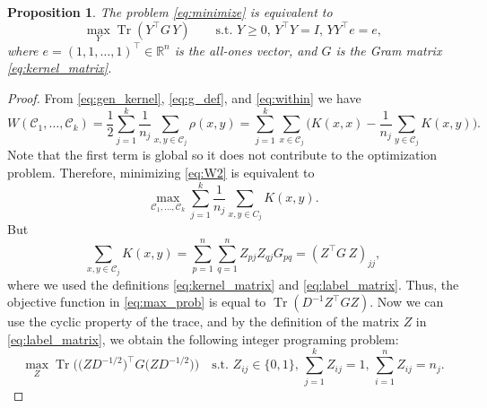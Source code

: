 \documentclass[aps,preprint,nofootinbib,floatfix]{revtex4-1}
\newtheorem{proposition}[theorem]{Proposition}
\DeclareMathOperator{\Tr}{Tr}
\newcommand\kk{K}
\newcommand\C{{\mathcal{C}}}
\newcommand\Zt{Y}
\newcommand\e{e}
\begin{document}
\begin{proposition} 
\label{th:qcqp2}
The problem \eqref{eq:minimize} is equivalent to
\begin{equation}
\label{eq:qcqp2}
\max_{\Zt} \Tr \left( \Zt^\top G \, \Zt \right)  \qquad
\mbox{s.t. $\Zt \ge 0$, $\Zt^\top \Zt = I$, 
$\Zt \Zt^\top \e = \e$},
\end{equation}
where $\e = (1,1,\dots,1)^\top \in \mathbb{R}^n$ is the all-ones vector,
and $G$ is the Gram matrix \eqref{eq:kernel_matrix}.
\end{proposition}
\begin{proof}
From 
\eqref{eq:gen_kernel},
\eqref{eq:g_def}, and
\eqref{eq:within}
we have
\begin{equation}
\label{eq:W2}
W(\C_1,\dotsc,\C_k  )
= \dfrac{1}{2} \sum_{j=1}^k \dfrac{1}{n_j} \sum_{x,y \in \C_j} \rho(x,y)
= \sum_{j=1}^k \sum_{x \in \C_j}  \bigg(
\kk(x,x) - \dfrac{1}{n_j} \sum_{y \in \C_j} \kk(x,y) \bigg).
\end{equation}
Note that the first term is global so it does not contribute to the 
optimization problem.
Therefore, minimizing \eqref{eq:W2} is equivalent to
\begin{equation}
\label{eq:max_prob}
\max_{ \C_1,\dotsc,\C_k } 
\sum_{j=1}^k \dfrac{1}{n_j} \sum_{x,y\in C_j} \kk(x,y) .
\end{equation}
But 
\begin{equation}
\sum_{x, y \in \C_j} \kk(x, y) =
\sum_{p=1}^{n} \sum_{q=1}^{n} Z_{pj} Z_{qj} G_{pq} = 
(Z^\top G \, Z)_{jj},
\end{equation}
where we used the definitions \eqref{eq:kernel_matrix} and
\eqref{eq:label_matrix}. Thus, the objective function in 
\eqref{eq:max_prob} is equal to
$\Tr \left( D^{-1} Z^\top G Z \right)$. 
Now we can
use the cyclic property
of the trace, and by the  definition of the matrix $Z$
in \eqref{eq:label_matrix}, we obtain the following integer
programing problem:
\begin{equation}\label{eq:qcqp}
\max_{Z} \Tr\Big( \big( Z D^{-1/2}\big)^\top G 
\big( ZD^{-1/2} \big) 
\Big) \quad
\mbox{s.t. $Z_{ij} \in \{0,1\}$, $\sum_{j=1}^k Z_{ij} = 1$, 
$\sum_{i=1}^n Z_{ij} = n_j$.}
\end{equation}


\end{proof}
\end{document}
